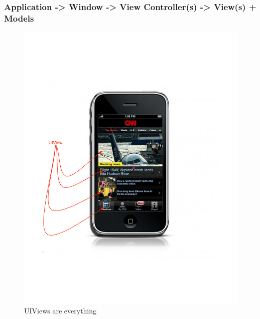 \documentclass[10pt]{beamer}
\begin{document}
\begin{frame}[fragile]
  \frametitle{Application -> Window -> View Controller(s) -> View(s) + Models}
  \begin{figure}[htb]
  \begin{center}
  
  \includegraphics[scale=0.35]{UIViewExample.pdf}
              
  \caption{UIViews are everything}
  \end{center}
  \end{figure}

\end{frame}
\end{document}
